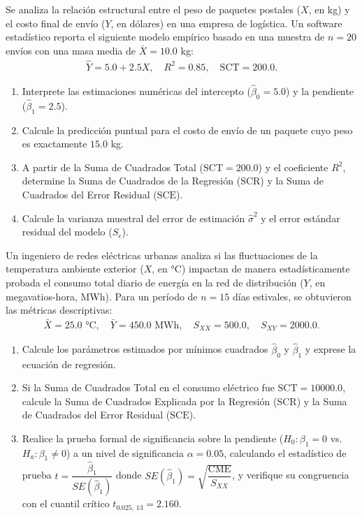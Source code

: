 \begin{problema}
	\label{prob:e5cf043}
	Se analiza la relación estructural entre el peso de paquetes postales ($X$, en kg) y el costo final de envío ($Y$, en dólares) en una empresa de logística. Un software estadístico reporta el siguiente modelo empírico basado en una muestra de $n = 20$ envíos con una masa media de $\bar{X} = 10.0$ kg:
	\begin{align}
		\hat{Y} = 5.0 + 2.5X, \quad R^2 = 0.85, \quad \text{SCT} = 200.0.
	\end{align}
	\begin{enumerate}
		\item Interprete las estimaciones numéricas del intercepto ($\hat{\beta}_0 = 5.0$) y la pendiente ($\hat{\beta}_1 = 2.5$).
		\item Calcule la predicción puntual para el costo de envío de un paquete cuyo peso es exactamente $15.0$ kg.
		\item A partir de la Suma de Cuadrados Total ($\text{SCT} = 200.0$) y el coeficiente $R^2$, determine la Suma de Cuadrados de la Regresión ($\text{SCR}$) y la Suma de Cuadrados del Error Residual ($\text{SCE}$).
		\item Calcule la varianza muestral del error de estimación $\hat{\sigma}^2$ y el error estándar residual del modelo ($S_e$).
	\end{enumerate}
\end{problema}

\begin{problema}
	\label{prob:5a642fc}
	Un ingeniero de redes eléctricas urbanas analiza si las fluctuaciones de la temperatura ambiente exterior ($X$, en °C) impactan de manera estadísticamente probada el consumo total diario de energía en la red de distribución ($Y$, en megavatios-hora, MWh). Para un período de $n = 15$ días estivales, se obtuvieron las métricas descriptivas:
	\begin{align}
		\bar{X} = 25.0 \text{ °C}, \quad \bar{Y} = 450.0 \text{ MWh}, \quad S_{XX} = 500.0, \quad S_{XY} = 2000.0.
	\end{align}
	\begin{enumerate}
		\item Calcule los parámetros estimados por mínimos cuadrados $\hat{\beta}_0$ y $\hat{\beta}_1$ y exprese la ecuación de regresión.
		\item Si la Suma de Cuadrados Total en el consumo eléctrico fue $\text{SCT} = 10000.0$, calcule la Suma de Cuadrados Explicada por la Regresión ($\text{SCR}$) y la Suma de Cuadrados del Error Residual ($\text{SCE}$).
		\item Realice la prueba formal de significancia sobre la pendiente ($H_0: \beta_1 = 0$ vs. $H_a: \beta_1 \neq 0$) a un nivel de significancia $\alpha = 0.05$, calculando el estadístico de prueba $t = \dfrac{\hat{\beta}_1}{SE(\hat{\beta}_1)}$ donde $SE(\hat{\beta}_1) = \sqrt{\dfrac{\text{CME}}{S_{XX}}}$, y verifique su congruencia con el cuantil crítico $t_{0.025, \, 13} = 2.160$.
	\end{enumerate}
\end{problema}

